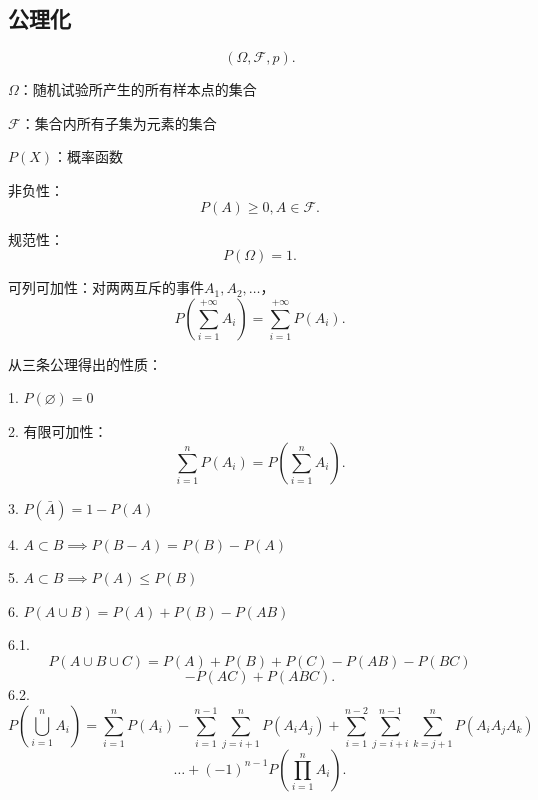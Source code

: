 \subsection{公理化}%
\label{sub:公理化}
\[
    \left( \Omega,\mathscr{F},p \right) 
.\] 
\begin{defi}
    $\Omega$：随机试验所产生的所有样本点的集合

    $\mathscr{F}$：集合内所有子集为元素的集合

    $P\left( X \right) $：概率函数
\end{defi}

\begin{axiom}
    非负性：\[
        P\left( A \right) \ge 0,A\in \mathscr{F}
    .\] 
\end{axiom}
\begin{axiom}
    规范性：\[
        P\left( \Omega \right) =1
    .\] 
\end{axiom}
\begin{axiom}
    可列可加性：对两两互斥的事件$A_1,A_2,\ldots$，\[
        P\left( \sum_{i=1}^{+\infty} A_i \right) =\sum_{i=1}^{+\infty} P\left( A_i \right) 
    .\] 
\end{axiom}
从三条公理得出的性质：
\begin{notation}
    1. $P\left( \varnothing \right) =0$ 

    2. 有限可加性： \[
        \sum_{i=1}^{n} P\left( A_i \right) =P\left( \sum_{i=1}^{n} A_i \right) 
    .\] 

    3. $P\left( \bar{A} \right) =1-P\left( A \right) $

    4. $A\subset B\implies P\left( B-A \right) =P\left( B \right) -P\left( A \right) $

    5. $A\subset B\implies P\left( A \right) \le P\left( B \right) $

    6. $P\left( A\cup B \right) =P\left( A \right) +P\left( B \right) -P\left( AB \right) $


\end{notation}
\begin{notation}
    6.1. \[
    P\left( A\cup B\cup C \right) =P\left( A \right) +P\left( B \right) +P\left( C \right) -P\left( AB \right) -P\left( BC \right) 
    \]
    \[
    -P\left( AC \right) +P\left( ABC \right) 
    .\] 
    6.2. \[
        P\left( \bigcup_{i=1}^{n}A_i \right) =\sum_{i=1}^{n} P\left( A_i \right) -\sum_{i=1}^{n-1} \sum_{j=i+1}^{n} P\left( A_{i}A_{j} \right)+\sum_{i=1}^{n-2} \sum_{j=i+i}^{n-1} \sum_{k=j+1}^{n} P\left( A_{i}A_{j}A_{k} \right) 
    \]
    \[
        \ldots+\left( -1 \right) ^{n-1}P\left( \prod_{i=1}^{n} A_{i}\right)  
    .\] 
\end{notation}

